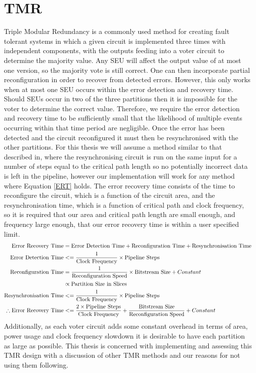 \documentclass[12pt,drafta4paper,oneside]{memoir} %
\begin{document}
\section{\acl{TMR}}
Triple Modular Redundancy is a commonly used method for creating fault tolerant systems in which a given circuit is implemented three times with independent components, with the outputs feeding into a voter circuit to determine the majority value. Any \ac{SEU} will affect the output value of at most one version, so the majority vote is still correct. One can then incorporate partial reconfiguration in order to recover from detected errors. However, this only works when at most one \ac{SEU} occurs within the error detection and recovery time. Should \acp{SEU} occur in two of the three partitions then it is impossible for the voter to determine the correct value. Therefore, we require the error detection and recovery time to be sufficiently small that the likelihood of multiple events occurring within that time period are negligible.
Once the error has been detected and the circuit reconfigured it must then be resynchronised with the other partitions. For this thesis we will assume a method similar to that described in\cite{DiesselChange}, where the resynchronising circuit is run on the same input for a number of steps equal to the critical path length so no potentially incorrect data is left in the pipeline, however our implementation will work for any method where Equation \ref{ERT} holds.
The error recovery time consists of the time to reconfigure the circuit, which is a function of the circuit area, and the resynchronisation time, which is a function of critical path and clock frequency, so it is required that our area and critical path length are small enough, and frequency large enough, that our error recovery time is within a user specified limit.
\begin{align}
    \mbox{Error Recovery Time} &=\mbox{Error Detection Time} + \mbox{Reconfiguration Time} + \mbox{Resynchronisation Time}\notag\\
    \mbox{Error Detection Time} &<= \frac{1}{\mbox{Clock Frequency}}\times\mbox{Pipeline Steps}\notag\\
    \mbox{Reconfiguration Time} &= \frac{1}{\mbox{Reconfiguration Speed}}\times\mbox{Bitstream Size}+Constant\notag\\
     &\propto \mbox{Partition Size in Slices}\notag\\
    \mbox{Resynchronisation Time} &<= \frac{1}{\mbox{Clock Frequency}}\times\mbox{Pipeline Steps}\\
    \therefore \mbox{Error Recovery Time} &<= \frac{2\times\mbox{Pipeline Steps}}{\mbox{Clock Frequency}} + \frac{\mbox{Bitstream Size}}{\mbox{Reconfiguration Speed}}+Constant\label{ERT}
\end{align}\cite{DiesselChange}
Additionally, as each voter circuit adds some constant overhead in terms of area, power usage and clock frequency slowdown it is desirable to have each partition as large as possible. This thesis is concerned with implementing and assessing this \ac{TMR} design with a discussion of other \ac{TMR} methods and our reasons for not using them following.
\end{document}
